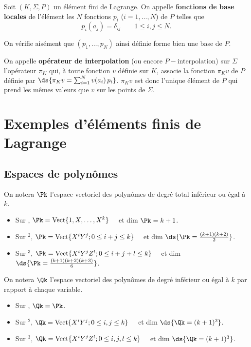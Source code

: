 %
\begin{definition}
  Soit $(K,\Sigma,P)$ un élément fini de Lagrange. On appelle {\bf
  fonctions de base locales} de l'élément les $N$ fonctions $p_i$
  ($i=1,\ldots,N$) de $P$ telles que
  \begin{equation}
    \label{eq:27}
    p_i(a_j)=\delta_{ij}\qquad 1\le i,j \le N.
  \end{equation}
  \label{def:26}
\end{definition}
%
On vérifie aisément que $(p_1,\ldots,p_N)$ ainsi définie forme bien une
base de $P$.
%
%
\begin{definition}
  On appelle {\bf opérateur de interpolation} (ou encore $P-$interpolation)
  sur $\Sigma$ l'opérateur $\pi_K$ qui, à toute fonction $v$ définie sur
  $K$, associe la fonction $\pi_K v$ de $P$ définie par $\ds{\pi_K v =
  \sum_{i=1}^N v(a_i)\, p_i}$. $\pi_K v$ est donc l'unique élément de $P$
  qui prend les mêmes valeurs que $v$ sur les points de
  $\Sigma$.\label{def:27}
\end{definition}

%
%
\section{Exemples d'éléments finis de Lagrange}
%
\subsection{Espaces de polyn\^omes}
\noindent
%
On notera $\Pk$ l'espace vectoriel des polyn\^omes de degré total inférieur ou égal à $k$.
%
\begin{itemize}
\item Sur \RR, $\Pk=\hbox{Vect} \{ 1,X,\ldots, X^k\}\quad$ et dim $\Pk=k+1$.
\item Sur \RR$^2$, $\Pk=\hbox{Vect} \{ X^i Y^j ; 0\le i+j \le k\}\quad$ et dim $\ds{ \Pk=\frac{(k+1)(k+2)}{2}}$.
\item Sur \RR$^3$, $\Pk=\hbox{Vect} \{ X^i Y^j Z^l ; 0\le i+j+l \le k\}\quad$ et dim $\ds{ \Pk=\frac{(k+1)(k+2)(k+3)}{6}}$.
\end{itemize}
%
On notera $\Qk$ l'espace vectoriel des polyn\^omes de degré inférieur ou égal à $k$ par rapport à chaque variable.
%
\begin{itemize}
\item Sur \RR, $\Qk=\Pk$.
\item Sur \RR$^2$, $\Qk=\hbox{Vect} \{ X^i Y^j ; 0\le i,j \le k\}\quad$ et dim $\ds{ \Qk=(k+1)^2}$.
\item Sur \RR$^3$, $\Qk=\hbox{Vect} \{ X^i Y^j Z^l ; 0\le i,j,l \le k\}\quad$ et dim $\ds{ \Qk=(k+1)^3}$.
\end{itemize}
%
%
